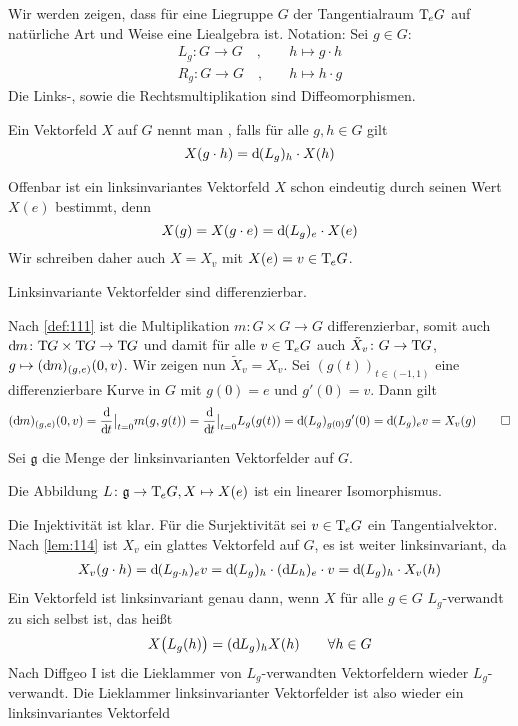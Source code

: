 Wir werden zeigen, dass für eine Liegruppe $G$ der Tangentialraum $\Tmap_e G$ auf natürliche Art und Weise eine Liealgebra ist.
Notation: Sei $g \in G$:
\begin{align}
	L_g \colon G \longrightarrow G \quad , \quad &h \longmapsto g \cdot h \\
	R_g \colon G \longrightarrow G \quad , \quad &h \longmapsto h \cdot g
\end{align}
Die Links-, sowie die Rechtsmultiplikation sind Diffeomorphismen. 

\begin{definition}
	Ein Vektorfeld $X$ auf $G$ nennt man , falls für alle $g,h \in G$ gilt
	\[
		X(g \cdot h) = \mathd(L_g)_h \cdot X(h)
	\]
\end{definition}

Offenbar ist ein linksinvariantes Vektorfeld $X$ schon eindeutig durch seinen Wert $X(e)$ bestimmt, denn 
\[
	X(g) = X(g \cdot e) = \mathd(L_g)_e \cdot X(e)
\]
Wir schreiben daher auch $X=X_v$ mit $X(e)=v \in \Tmap_e G$.

\begin{lemma}[label=lem:114]
	Linksinvariante Vektorfelder sind differenzierbar.
\end{lemma}
\begin{beweis}
	Nach \autoref{def:111} ist die Multiplikation $m \colon G \times G \to G$ differenzierbar, somit auch $\mathd m \colon \Tmap G \times \Tmap G \to\Tmap G$ und damit für alle $v \in \Tmap_e G$ auch $\tilde{X}_v \colon G \to \Tmap G$, $g \mapsto (\mathd m)_{(g,e)}(0,v)$.
	Wir zeigen nun $\tilde{X}_v=X_v$.
	Sei $(g(t))_{t \in (-1,1)}$ eine differenzierbare Kurve in $G$ mit $g(0)=e$ und $g'(0)=v$.
	Dann gilt 
	\[
		(\mathd m)_{(g,e)}(0,v) = \diffd{}{t}\big|_{t=0} m \enbrace*{g,g(t)} = \diffd{}{t}\big|_{t=0} L_g\enbrace{g(t)} = \mathd(L_g)_{g(0)} g'(0)
		 =\mathd(L_g)_e v = X_v(g) \qedhere
	\]
\end{beweis}

Sei $\mathfrak{g}$ die Menge der linksinvarianten Vektorfelder auf $G$.

\begin{korollar}
	Die Abbildung $L \colon \mathfrak{g} \to \Tmap_e G, X \mapsto X(e)$ ist ein linearer Isomorphismus.
\end{korollar}
\begin{beweis}
	Die Injektivität ist klar.
	Für die Surjektivität sei $v \in \Tmap_e G$ ein Tangentialvektor.
	Nach \autoref{lem:114} ist $X_v$ ein glattes Vektorfeld auf $G$, es ist weiter linksinvariant, da
	\begin{align}
		X_v(g \cdot h) = \mathd(L_{g \cdot h})_e v = \mathd(L_g)_h \cdot (\mathd L_h)_e \cdot v = \mathd (L_g)_h \cdot X_v(h)
	\end{align}
	Ein Vektorfeld ist linksinvariant genau dann, wenn $X$ für alle $g \in G$ $L_g$-verwandt zu sich selbst ist, das heißt
	\[
		X \enbrace[\big]{L_g(h)} = (\mathd L_g)_h X(h) \qquad  \forall h \in G
	\]
	Nach Diffgeo I ist die Lieklammer von $L_g$-verwandten Vektorfeldern wieder $L_g$-verwandt.
	Die Lieklammer linksinvarianter Vektorfelder ist also wieder ein linksinvariantes Vektorfeld
\end{beweis}

